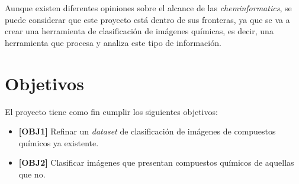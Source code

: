 Aunque existen diferentes opiniones sobre el alcance de las \textit{cheminformatics}, se puede considerar que este proyecto está dentro de sus fronteras, ya que se va a crear una herramienta de clasificación de imágenes químicas, es decir, una herramienta que procesa y analiza este tipo de información.

\section{Objetivos}
El proyecto tiene como fin cumplir los siguientes objetivos:

\begin{itemize} \label{objetivos}
    \item \textbf{[OBJ1]} Refinar un \textit{dataset} de clasificación de imágenes de compuestos químicos ya existente.
    \item \textbf{[OBJ2]} Clasificar imágenes que presentan compuestos químicos de aquellas que no.
\end{itemize}